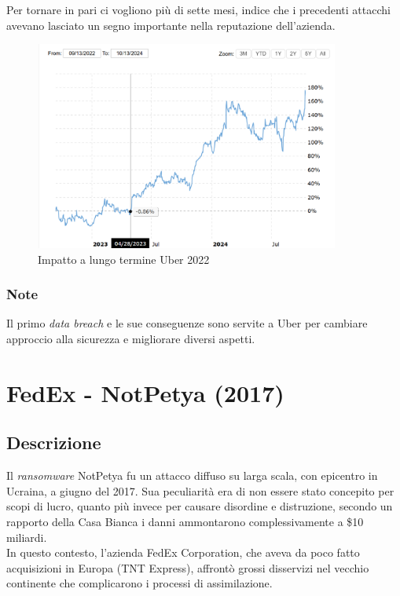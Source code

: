 \documentclass[12pt,a4paper,openright,twoside]{report}
\begin{document}
Per tornare in pari ci vogliono pi\`u di sette mesi, indice che i precedenti attacchi avevano lasciato un segno importante nella reputazione dell'azienda.\\

\begin{figure}[H] 
\begin{center} 
\includegraphics[width=10cm]{figures/uber_2022_long.png} 
\caption[Grafico Uber 2022 long]{Impatto a lungo termine Uber 2022}\label{fig:ubr2}
\end{center}
\end{figure}

\subsubsection{Note}
Il primo \textit{data breach} e le sue conseguenze sono servite a Uber per cambiare approccio alla sicurezza e migliorare diversi aspetti\cite{Uber_2022}.

\section{FedEx - NotPetya (2017)}
\subsection{Descrizione}
Il \textit{ransomware} NotPetya fu un attacco diffuso su larga scala, con epicentro in Ucraina, a giugno del 2017. Sua  peculiarit\`a era di non essere stato concepito per scopi di lucro, quanto pi\`u invece per causare disordine e distruzione\cite{FedEx_evolutionOfRansom}, secondo un rapporto della Casa Bianca i danni ammontarono complessivamente a \$10 miliardi\cite{FedEx_wired}.\\
In questo contesto, l'azienda FedEx Corporation, che aveva da poco fatto acquisizioni in Europa (TNT Express), affront\`o grossi disservizi nel vecchio continente che complicarono i processi di assimilazione\cite{FedEx_10K_report_2018}.\\
\end{document}
